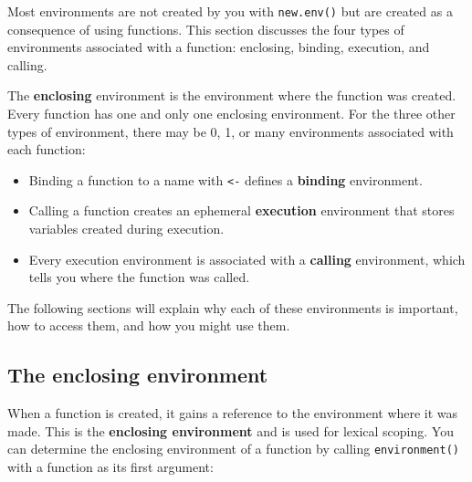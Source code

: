
Most environments are not created by you with \texttt{new.env()} but are
created as a consequence of using functions. This section discusses the
four types of environments associated with a function: enclosing,
binding, execution, and calling. 

The \textbf{enclosing} environment is the environment where the function
was created. Every function has one and only one enclosing environment.
For the three other types of environment, there may be 0, 1, or many
environments associated with each function:

\begin{itemize}
\item
  Binding a function to a name with \texttt{\textless{}-} defines a
  \textbf{binding} environment.
\item
  Calling a function creates an ephemeral \textbf{execution} environment
  that stores variables created during execution.
\item
  Every execution environment is associated with a \textbf{calling}
  environment, which tells you where the function was called.
\end{itemize}

The following sections will explain why each of these environments is
important, how to access them, and how you might use them.

\subsection{The enclosing environment}

When a function is created, it gains a reference to the environment
where it was made. This is the \textbf{enclosing environment} and is
used for lexical scoping. You can determine the enclosing environment of
a function by calling \texttt{environment()} with a function as its
first argument: 

\begin{Shaded}
\begin{Highlighting}[]
\StringTok{ }
\StringTok{ }\StringTok{ }
\end{Highlighting}
\end{Shaded}


